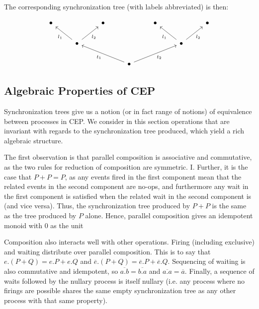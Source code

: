 \documentclass[hoptionsi,review,screen,format=sigconf]{acmart}
\theoremstyle{definition}
\begin{document}
The corresponding synchronization tree (with labels abbreviated) is then:

\begin{equation*}
\begin{tikzcd}
\bullet &                                              & \bullet &                                                & \bullet &                                              & \bullet \\
        & \bullet \arrow[lu, "l_1"] \arrow[ru, "l_2"'] &         &                                                &         & \bullet \arrow[lu, "l_1"] \arrow[ru, "l_2"'] &         \\
        &                                              &         & \bullet \arrow[llu, "t_1"] \arrow[rru, "t_2"'] &         &                                              &        
\end{tikzcd}
\end{equation*}

\subsection{Algebraic Properties of CEP}

Synchronization trees give us a notion (or in fact range of notions) of equivalence between processes in CEP. We consider in this section operations that are invariant with regards to the synchronization tree produced, which yield a rich algebraic structure.



The first observation is that parallel composition is associative and commutative, as the two rules for reduction of composition are symmetric. I. Further, it is the case that \(P + P = P\), as any events fired in the first component mean that the related events in the second component are no-ops, and furthermore any wait in the first component is satisfied when the related wait in the second component is (and vice versa). Thus, the synchronization tree produced by \(P + P\) is the same as the tree produced by \(P\) alone. Hence, parallel composition gives an idempotent monoid with \(0\) as the unit

Composition also interacts well with other operations. Firing (including exclusive) and waiting distribute over parallel composition. This is to say that  \(e.(P + Q) = e.P + e.Q\) and \(\overline{e}.(P + Q) = \overline{e}.P + \overline{e}.Q\). Sequencing of waiting is also commutative and idempotent, so \(\overline{a.b} = \overline{b.a}\) and \(\overline{a.a} = \overline{a}\). Finally, a sequence of waits followed by the nullary process is itself nullary (i.e. any process where no firings are possible shares the same empty synchronization tree as any other process with that same property).
\end{document}
